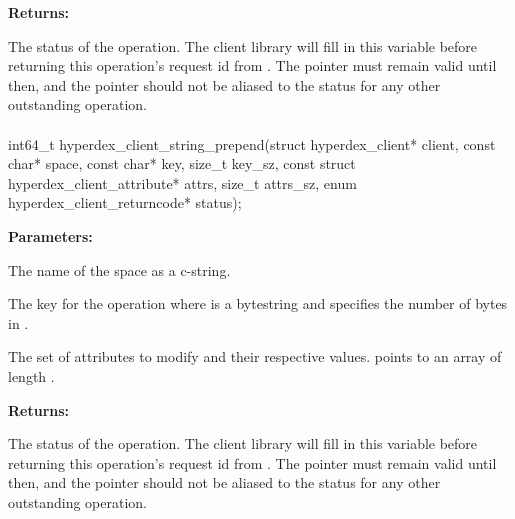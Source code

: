 \noindent\textbf{Returns:}
\begin{description}[labelindent=\widthof{{\code{status}}},leftmargin=*,noitemsep,nolistsep,align=right]
\item[\code{status}] The status of the operation.  The client library will fill in this variable before returning this operation's request id from .  The pointer must remain valid until then, and the pointer should not be aliased to the status for any other outstanding operation.
\end{description}

\paragraph{}
\label{api:c:string_prepend}
\begin{ccode}
int64_t hyperdex_client_string_prepend(struct hyperdex_client* client,
                const char* space,
                const char* key, size_t key_sz,
                const struct hyperdex_client_attribute* attrs, size_t attrs_sz,
                enum hyperdex_client_returncode* status);
\end{ccode}
\funcdesc 

\noindent\textbf{Parameters:}
\begin{description}[labelindent=\widthof{{\code{attrs}, \code{attrs\_sz}}},leftmargin=*,noitemsep,nolistsep,align=right]
\item[\code{space}] The name of the space as a c-string.
\item[\code{key}, \code{key\_sz}] The key for the operation where  is a bytestring and  specifies the number of bytes in .
\item[\code{attrs}, \code{attrs\_sz}] The set of attributes to modify and their respective values.   points to an array of length .
\end{description}

\noindent\textbf{Returns:}
\begin{description}[labelindent=\widthof{{\code{status}}},leftmargin=*,noitemsep,nolistsep,align=right]
\item[\code{status}] The status of the operation.  The client library will fill in this variable before returning this operation's request id from .  The pointer must remain valid until then, and the pointer should not be aliased to the status for any other outstanding operation.
\end{description}

